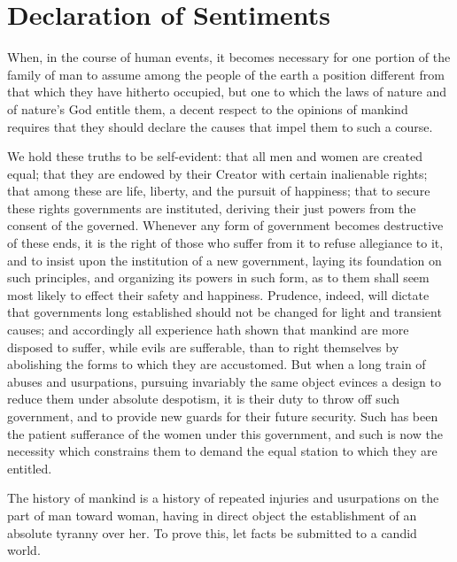 
\author{Elizabeth Cady Stanton}
\chapter[Elizabeth Cady Stanton -- Declaration of
Sentiments]{Declaration of Sentiments}


When, in the course of human events, it becomes necessary for
one portion of the family of man to assume among the people of the
earth a position different from that which they have hitherto
occupied, but one to which the laws of nature and of nature's God
entitle them, a decent respect to the opinions of mankind requires
that they should declare the causes that impel them to such a course.

We hold these truths to be self-evident: that all men and women are
created equal; that they are endowed by their Creator with certain
inalienable rights; that among these are life, liberty, and the
pursuit of happiness; that to secure these rights governments are
instituted, deriving their just powers from the consent of the
governed. Whenever any form of government becomes destructive of these
ends, it is the right of those who suffer from it to refuse allegiance
to it, and to insist upon the institution of a new government, laying
its foundation on such principles, and organizing its powers in such
form, as to them shall seem most likely to effect their safety and
happiness. Prudence, indeed, will dictate that governments long
established should not be changed for light and transient causes; and
accordingly all experience hath shown that mankind are more disposed
to suffer, while evils are sufferable, than to right themselves by
abolishing the forms to which they are accustomed. But when a long
train of abuses and usurpations, pursuing invariably the same object
evinces a design to reduce them under absolute despotism, it is their
duty to throw off such government, and to provide new guards for their
future security. Such has been the patient sufferance of the women
under this government, and such is now the necessity which constrains
them to demand the equal station to which they are entitled.

The history of mankind is a history of repeated injuries and
usurpations on the part of man toward woman, having in direct object
the establishment of an absolute tyranny over her. To prove this, let
facts be submitted to a candid world.


